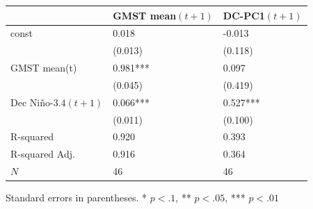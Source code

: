 \begin{tabular}{lll}
\hline
               & GMST mean$(t+1)$ & DC-PC1$(t+1)$  \\
\hline
const          & 0.018              & -0.013           \\
               & (0.013)            & (0.118)          \\
GMST mean(t)   & 0.981***           & 0.097            \\
               & (0.045)            & (0.419)          \\
Dec Ni\~{n}o-3.4$(t+1)$   & 0.066***           & 0.527***         \\
               & (0.011)            & (0.100)          \\
R-squared      & 0.920              & 0.393            \\
R-squared Adj. & 0.916              & 0.364            \\
$N$          & 46                 & 46               \\
\hline
\end{tabular}

{Standard errors in parentheses. * $p<.1$, ** $p<.05$, *** $p<.01$}